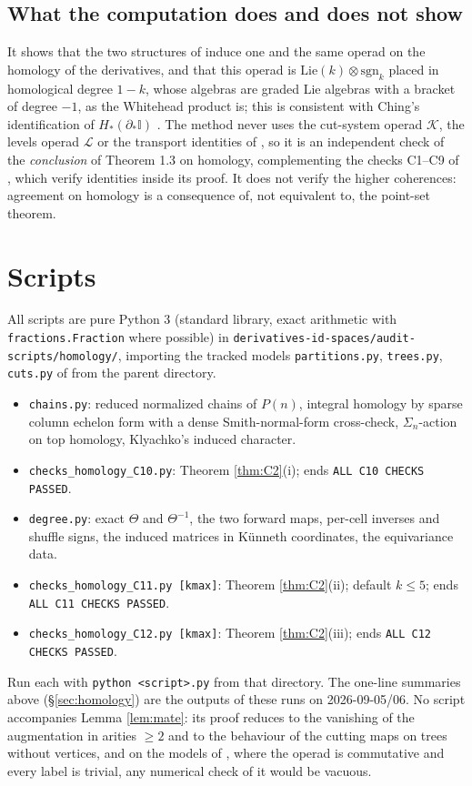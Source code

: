 \documentclass[11pt]{amsart}
\theoremstyle{definition}
\theoremstyle{remark}
\newcommand{\Id}{\mathbb{I}}
\newcommand{\Kop}{\mathcal{K}}
\newcommand{\Lop}{\mathcal{L}}
\newcommand{\sgn}{\mathrm{sgn}}
\begin{document}
\subsection{What the computation does and does not show}
It shows that the two structures of \cite[Theorem 1.3]{Cl2} induce one and the same operad on the homology of the derivatives, and that this operad is $\mathrm{Lie}(k)\otimes\sgn_k$ placed in homological degree $1-k$, whose algebras are graded Lie algebras with a bracket of degree $-1$, as the Whitehead product is; this is consistent with Ching's identification of $H_*(\partial_*\Id)$ \cite{Ch05}. The method never uses the cut-system operad $\Kop$, the levels operad $\Lop$ or the transport identities of \cite[\S\S A.46--A.71]{Cl2}, so it is an independent check of the \emph{conclusion} of Theorem 1.3 on homology, complementing the checks C1--C9 of \cite[Appendix C]{Cl2}, which verify identities inside its proof. It does not verify the higher coherences: agreement on homology is a consequence of, not equivalent to, the point-set theorem.

\section{Scripts}\label{sec:scripts}
All scripts are pure Python 3 (standard library, exact arithmetic with \texttt{fractions.Fraction} where possible) in \texttt{derivatives-id-spaces/audit-scripts/homology/}, importing the tracked models \texttt{partitions.py}, \texttt{trees.py}, \texttt{cuts.py} of \cite[Appendix C]{Cl2} from the parent directory.
\begin{itemize}[leftmargin=2em]
\item \texttt{chains.py}: reduced normalized chains of $P(n)$, integral homology by sparse column echelon form with a dense Smith-normal-form cross-check, $\Sigma_n$-action on top homology, Klyachko's induced character.
\item \texttt{checks\_homology\_C10.py}: Theorem \ref{thm:C2}(i); ends \texttt{ALL C10 CHECKS PASSED}.
\item \texttt{degree.py}: exact $\Theta$ and $\Theta^{-1}$, the two forward maps, per-cell inverses and shuffle signs, the induced matrices in K\"unneth coordinates, the equivariance data.
\item \texttt{checks\_homology\_C11.py [kmax]}: Theorem \ref{thm:C2}(ii); default $k\leq5$; ends \texttt{ALL C11 CHECKS PASSED}.
\item \texttt{checks\_homology\_C12.py [kmax]}: Theorem \ref{thm:C2}(iii); ends \texttt{ALL C12 CHECKS PASSED}.
\end{itemize}
Run each with \texttt{python <script>.py} from that directory. The one-line summaries above (\S\ref{sec:homology}) are the outputs of these runs on 2026-09-05/06. No script accompanies Lemma \ref{lem:mate}: its proof reduces to the vanishing of the augmentation in arities $\geq2$ and to the behaviour of the cutting maps on trees without vertices, and on the models of \cite[Appendix C]{Cl2}, where the operad is commutative and every label is trivial, any numerical check of it would be vacuous.
\end{document}
